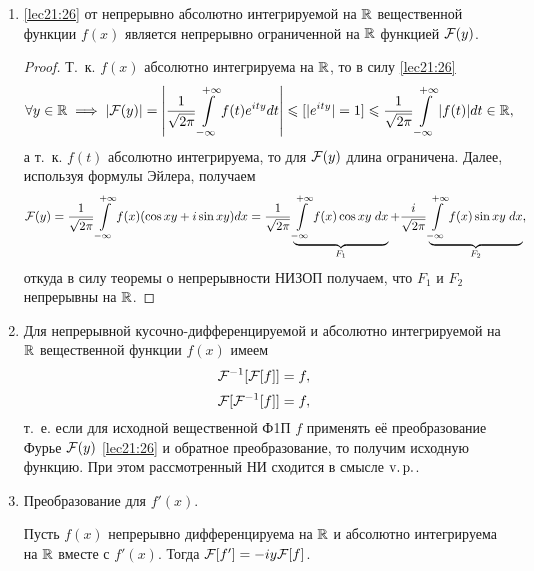 \documentclass[../../main.tex]{subfiles}
\begin{document}
\begin{enumerate}
  \item \eqref{lec21:26} от непрерывно абсолютно интегрируемой на $\mathbb{R}$ 
  вещественной функции $f(x)$ является непрерывно ограниченной на $\mathbb{R}$ 
  функцией 
  $\mathcal{F}(y)$.
  \begin{proof}
    Т.~к. $f(x)$ абсолютно интегрируема на $\mathbb{R}$, то в силу \eqref{lec21:26}
    \begin{multline*}
      \forall y \in \mathbb{R} \implies |\mathcal{F}(y)| = \left|\frac{1}{\sqrt{2\pi}} \int\limits_{-\infty}^{+\infty} 
      f(t)e^{ity}dt\right| \leqslant [|e^{ity}| = 1] \leqslant \frac{1}{\sqrt{2\pi}} 
      \int\limits_{-\infty}^{+\infty}|f(t)|dt \in \mathbb{R},
    \end{multline*}
    а т.~к. $f(t)$ абсолютно интегрируема, то для $\mathcal{F}(y)$ 
    длина ограничена. Далее, используя формулы Эйлера, получаем
    \begin{multline*}
      \mathcal{F}(y) = \frac{1}{\sqrt{2\pi}} \int\limits_{-\infty}^{+\infty} f(x) (\cos xy + i\sin xy)dx = 
      \frac{1}{\sqrt{2\pi}}
      \underbrace{\int\limits_{-\infty}^{+\infty} f(x) \cos xy\;dx}_{F_1} + \frac{i}{\sqrt{2\pi}} 
      \underbrace{\int\limits_{-\infty}^{+\infty} f(x) \sin xy\;dx}_{F_2},
    \end{multline*}
    откуда в силу теоремы о непрерывности НИЗОП получаем, что $F_1$ и 
    $F_2$ непрерывны на $\mathbb{R}$.
  \end{proof}
  
  \item Для непрерывной кусочно-дифференцируемой и абсолютно интегрируемой 
  на $\mathbb{R}$ вещественной функции $f(x)$ имеем  \[\mathcal{F}^{-1}[\mathcal{F}[f]] = f,\] 
  \[\mathcal{F}[\mathcal{F}^{-1}[f]] = f,\] т.~е. если для исходной вещественной Ф1П $f$ 
  применять её преобразование Фурье $\mathcal{F}(y)$ \eqref{lec21:26} и обратное 
  преобразование, то получим исходную функцию. При этом рассмотренный НИ 
  сходится в смысле $\operatorname{v.p.}$.
  
  \item Преобразование для $f'(x)$.
  
  Пусть $f(x)$ непрерывно дифференцируема на $\mathbb{R}$ и абсолютно интегрируема 
  на $\mathbb{R}$ вместе с $f'(x)$. Тогда $\mathcal{F}[f'] = -iy\mathcal{F}[f]$.
  

\end{enumerate}
\end{document}
